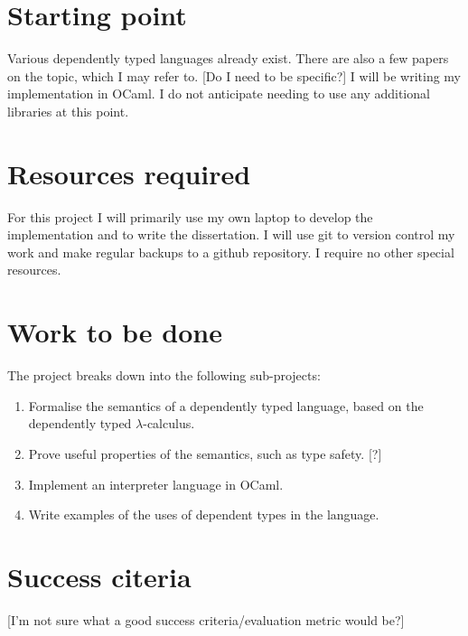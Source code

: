 \documentclass[12pt,a4paper,twoside]{article}
\begin{document}
\section*{Starting point}

Various dependently typed languages already exist.
There are also a few papers on the topic, which I may refer to.
[Do I need to be specific?]
I will be writing my implementation in OCaml.
I do not anticipate needing to use any additional libraries at this point.

\section*{Resources required}

For this project I will primarily use my own laptop to develop the implementation and to write the dissertation.
I will use git to version control my work and make regular backups to a github repository.
I require no other special resources.

\section*{Work to be done}

The project breaks down into the following sub-projects:

\begin{enumerate}

\item Formalise the semantics of a dependently typed language, based on the dependently typed \(\lambda\)-calculus.

\item Prove useful properties of the semantics, such as type safety. [?]

\item Implement an interpreter language in OCaml.

\item Write examples of the uses of dependent types in the language.

\end{enumerate}

\section*{Success citeria}

[I'm not sure what a good success criteria/evaluation metric would be?]
\end{document}

